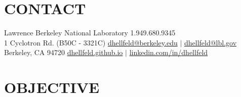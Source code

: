 \documentclass[margin, 10pt]{style/res} %
\begin{document}
\begin{resume}



\vspace{-10pt}
\section{\small{CONTACT}}  


Lawrence Berkeley National Laboratory \hfill 1.949.680.9345\\
1 Cyclotron Rd. (B50C - 3321C) \hfill \href{mailto:dhellfeld@berkeley.edu}{dhellfeld@berkeley.edu} $|$ \href{mailto:dhellfeld@lbl.gov} {dhellfeld@lbl.gov} \\
Berkeley, CA  94720  \hfill \href{https://dhellfeld.github.io}{dhellfeld.github.io} $|$ \href{https://www.linkedin.com/in/dhellfeld}{linkedin.com{\small{/}}in{\small{/}}dhellfeld} 






 
\section{\small{OBJECTIVE}} 


\end{resume}
\end{document}
